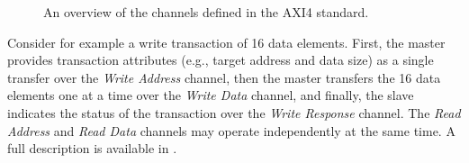 \documentclass[conference]{IEEEtran}
\begin{document}
\begin{figure}[t]
  \centering
  \hfill
  \label{fig:axi4}
  \caption{An overview of the channels defined in the AXI4 standard.}
\end{figure}


Consider for example a write transaction of 16 data elements. First, the master provides transaction attributes (e.g., target address and data size) as a single transfer over the \textit{Write Address} channel, then the master transfers the 16 data elements one at a time over the \textit{Write Data} channel, and finally, the slave indicates the status of the transaction over the \textit{Write Response} channel. The \textit{Read Address} and \textit{Read Data} channels may operate independently at the same time. A full description is available in \cite{axi4standard}.
\end{document}
